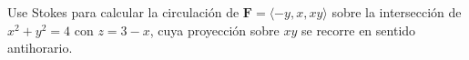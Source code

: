 ﻿Use Stokes para calcular la circulación de $\mathbf F=\langle-y,x,xy\rangle$ sobre la intersección de $x^2+y^2=4$ con $z=3-x$, cuya proyección sobre $xy$ se recorre en sentido antihorario.
